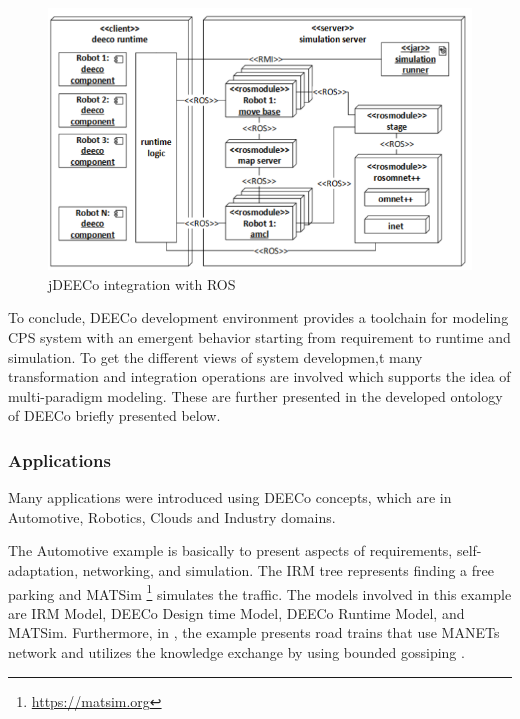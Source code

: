\begin{figure}[!htb]
\centering
\includegraphics[scale=0.65]{figures/ros}
\caption{jDEECo integration with ROS}
\label{fig:ros}
\end{figure}


 To conclude, DEECo development environment provides a toolchain for modeling CPS system with an emergent behavior starting from requirement to runtime and simulation. To get the different views of system developmen,t many transformation and integration operations are involved which supports the idea of multi-paradigm modeling. These are further presented in the developed ontology of DEECo briefly presented below.
 
 
 
\subsubsection{Applications}
  Many applications were introduced using DEECo concepts, which are in Automotive, Robotics, Clouds and Industry domains. 
 
 The Automotive example \cite{Hoch2015emobi} is basically to present aspects of requirements, self-adaptation, networking, and simulation. The IRM tree represents finding a free parking and MATSim \footnote{\url{https://matsim.org}} simulates the traffic. The models involved in this example are IRM Model, DEECo Design time Model, DEECo Runtime Model, and MATSim. Furthermore, in  \cite{Kit2015empl}, the example presents road trains that use MANETs network and utilizes the knowledge exchange by using bounded gossiping \cite{10.1007/978-3-319-09970-5_23}.

